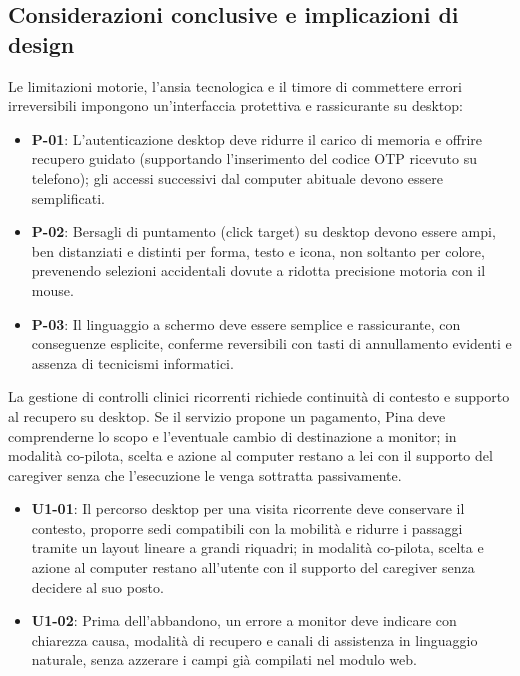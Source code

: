 \subsection[Implicazioni progettuali]{Considerazioni conclusive e implicazioni di design}
\vspace{-2pt}
Le limitazioni motorie, l'ansia tecnologica e il timore di commettere errori irreversibili impongono un'interfaccia protettiva e rassicurante su desktop:
\begin{itemize}[leftmargin=*,topsep=1.5pt,itemsep=0.5pt,parsep=0pt]
\item \hypertarget{req:P-01}{}\textbf{P-01}: L'autenticazione desktop deve ridurre il carico di memoria e offrire recupero guidato (supportando l'inserimento del codice OTP ricevuto su telefono); gli accessi successivi dal computer abituale devono essere semplificati.
\item \hypertarget{req:P-02}{}\textbf{P-02}: Bersagli di puntamento (click target) su desktop devono essere ampi, ben distanziati e distinti per forma, testo e icona, non soltanto per colore, prevenendo selezioni accidentali dovute a ridotta precisione motoria con il mouse.
\item \hypertarget{req:P-03}{}\textbf{P-03}: Il linguaggio a schermo deve essere semplice e rassicurante, con conseguenze esplicite, conferme reversibili con tasti di annullamento evidenti e assenza di tecnicismi informatici.
\end{itemize}

La gestione di controlli clinici ricorrenti richiede continuità di contesto e supporto al recupero su desktop. Se il servizio propone un pagamento, Pina deve comprenderne lo scopo e l'eventuale cambio di destinazione a monitor; in modalità co-pilota, scelta e azione al computer restano a lei con il supporto del caregiver senza che l'esecuzione le venga sottratta passivamente.
\begin{itemize}[leftmargin=*,topsep=1.5pt,itemsep=0.5pt,parsep=0pt]
\item \hypertarget{req:U1-01}{}\textbf{U1-01}: Il percorso desktop per una visita ricorrente deve conservare il contesto, proporre sedi compatibili con la mobilità e ridurre i passaggi tramite un layout lineare a grandi riquadri; in modalità co-pilota, scelta e azione al computer restano all'utente con il supporto del caregiver senza decidere al suo posto.
\item \hypertarget{req:U1-02}{}\textbf{U1-02}: Prima dell'abbandono, un errore a monitor deve indicare con chiarezza causa, modalità di recupero e canali di assistenza in linguaggio naturale, senza azzerare i campi già compilati nel modulo web.
\end{itemize}


